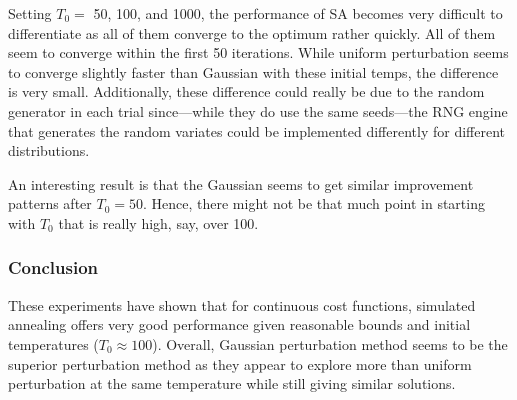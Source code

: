 Setting \(T_0 =\) 50, 100, and 1000, the performance of SA becomes very difficult to differentiate as all of them converge to the optimum rather quickly. All of them seem to converge within the first 50 iterations. While uniform perturbation seems to converge slightly faster than Gaussian with these initial temps, the difference is very small. Additionally, these difference could really be due to the random generator in each trial since---while they do use the same seeds---the RNG engine that generates the random variates could be implemented differently for different distributions.

An interesting result is that the Gaussian seems to get similar improvement patterns after \(T_0 = 50\). Hence, there might not be that much point in starting with \(T_0\) that is really high, say, over 100.

\subsubsection*{Conclusion}

These experiments have shown that for continuous cost functions, simulated annealing offers very good performance given reasonable bounds and initial temperatures (\(T_0 \approx 100\)). Overall, Gaussian perturbation method seems to be the superior perturbation method as they appear to explore more than uniform perturbation at the same temperature while still giving similar solutions.
